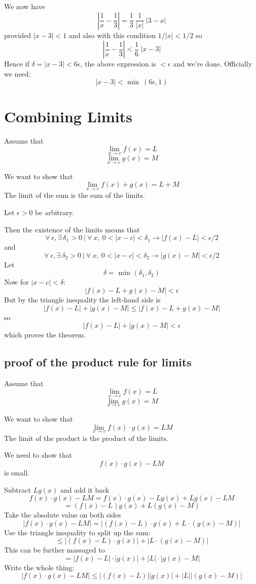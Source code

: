 \documentclass[11pt, oneside]{article}
\begin{document}
We now have
\[ | \frac{1}{x} - \frac{1}{3} | = \frac{1}{3} \ \frac{1}{|x|} \ |3 - x|   \]
provided $|x - 3| < 1$ and also with this condition $1/|x| < 1/2$ so
\[  | \frac{1}{x} - \frac{1}{3} | < \frac{1}{6} \ |x - 3| \]
Hence if $\delta = |x - 3| < 6 \epsilon$, the above expression is $< \epsilon$ and we're done.  Officially we need:
\[ |x - 3| < \min \ (6 \epsilon, 1) \]

\section{Combining Limits}

Assume that
\[ \lim_{x \rightarrow c} f(x) = L \]
\[ \lim_{x \rightarrow c} g(x) = M \]

We want to show that
\[ \lim_{x \rightarrow c} f(x) + g(x) = L + M \]
The limit of the sum is the sum of the limits.

Let $\epsilon > 0$ be arbitrary.

Then the existence of the limits means that
\[ \forall \ \epsilon, \exists \ \delta_1 > 0 \ | \ \forall \ x, \ 0 < | x - c| < \delta_1 \rightarrow | f(x) - L | < \epsilon/2 \]
and
\[ \forall \ \epsilon, \exists \ \delta_2 > 0 \ | \ \forall \ x, \ 0 < | x - c| < \delta_2 \rightarrow | g(x) - M | < \epsilon/2 \]
Let
\[ \delta = \text{ min } (\delta_1, \delta_2) \]
Now for $|x - c| < \delta$:
\[ | f(x) - L + g(x) - M| < \epsilon \]
But by the triangle inequality the left-hand side is 
\[ | f(x) - L| + |g(x) - M|  \le | f(x) - L + g(x) - M|  \]
so
\[   | f(x) - L| + |g(x) - M| < \epsilon \]
which proves the theorem.

\subsection*{proof of the product rule for limits}
Assume that
\[ \lim_{x \rightarrow c} f(x) = L \]
\[ \lim_{x \rightarrow c} g(x) = M \]

We want to show that
\[ \lim_{x \rightarrow c} f(x) \cdot g(x) = LM \]
The limit of the product is the product of the limits.

We need to show that
\[ f(x) \cdot g(x) - LM \]
is small.  

Subtract $L g(x)$ and add it back
\[ f(x) \cdot g(x) - LM = f(x) \cdot g(x) - L g(x) + L g(x) - LM \]
\[ = (f(x) - L) g(x) + L (g(x) - M ) \]
Take the absolute value on both sides
\[  |f(x) \cdot g(x) - LM| = |(f(x) - L) \cdot g(x) + L \cdot (g(x) - M )| \]
Use the triangle inequality to split up the sum:
\[ \le |(f(x) - L) \cdot g(x)| + |L \cdot (g(x) - M )| \]
This can be further massaged to 
\[  =| f(x) - L | \cdot |g(x)| + |L| \cdot |g(x) - M | \]
Write the whole thing:
\[ |f(x) \cdot g(x) - LM| \le |(f(x) - L) | | g(x) | + | L | | (g(x) - M )| \]
\end{document}
